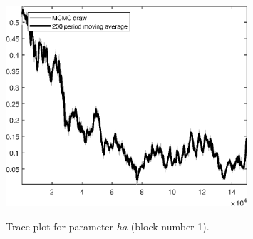 \begin{figure}[H]
\centering
  \includegraphics[width=0.8\textwidth]{BRS_sectoral_KK/graphs/TracePlot_ha_blck_1}\\
    \caption{Trace plot for parameter ${ha}$ (block number 1).}
\end{figure}

